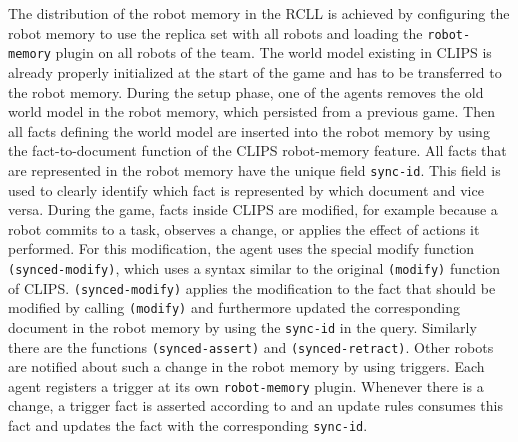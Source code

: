 The distribution of the robot memory in the RCLL is achieved by
configuring the robot memory to use the replica set with all robots
and loading the \texttt{robot-memory} plugin on all robots of the
team. The world model existing in CLIPS is already properly
initialized at the start of the game and has to be transferred to the
robot memory. During the setup phase, one of the agents removes the
old world model in the robot memory, which persisted from a previous
game. Then all facts defining the world model are inserted into the
robot memory by using the fact-to-document function of the CLIPS
robot-memory feature. All facts that are represented in the robot
memory have the unique field \texttt{sync-id}. This field is used to
clearly identify which fact is represented by which document and vice
versa. During the game, facts inside CLIPS are modified, for example
because a robot commits to a task, observes a change, or applies the
effect of actions it performed. For this modification, the agent uses
the special modify function \texttt{(synced-modify)}, which uses a
syntax similar to the original \texttt{(modify)} function of
CLIPS. \texttt{(synced-modify)} applies the modification to the fact
that should be modified by calling \texttt{(modify)} and furthermore
updated the corresponding document in the robot memory by using the
\texttt{sync-id} in the query. Similarly there are the functions
\texttt{(synced-assert)} and \texttt{(synced-retract)}. Other robots
are notified about such a change in the robot memory by using
triggers. Each agent registers a trigger at its own
\texttt{robot-memory} plugin. Whenever there is a change, a trigger
fact is asserted according to  and an update
rules consumes this fact and updates the fact with the corresponding
\texttt{sync-id}.

